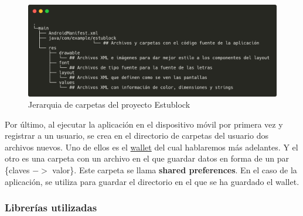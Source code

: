 \begin{figure}[h!]
  \centering
  \includegraphics[width=0.9\linewidth]{figs/Desarrollo/JerarquiaCarpetas}
  \caption[Jerarquia Estublock]{Jerarquia de carpetas del proyecto Estublock}
  \label{fig:jerarquia_estublock}
\end{figure}

Por último, al ejecutar la aplicación en el dispositivo móvil por primera vez y registrar a un usuario, se crea en el directorio de carpetas del usuario dos archivos nuevos. Uno de ellos es el \hyperref[sec:wallet]{wallet} del cual hablaremos más adelantes. Y el otro es una carpeta con un archivo en el que guardar datos en forma de un par \{claves $->$ valor\}. Este carpeta se llama \textbf{shared preferences}. En el caso de la aplicación, se utiliza para guardar el directorio en el que se ha guardado el wallet.

\vspace{5cm}
\subsubsection{Librerías utilizadas} \label{sec:librerias}

